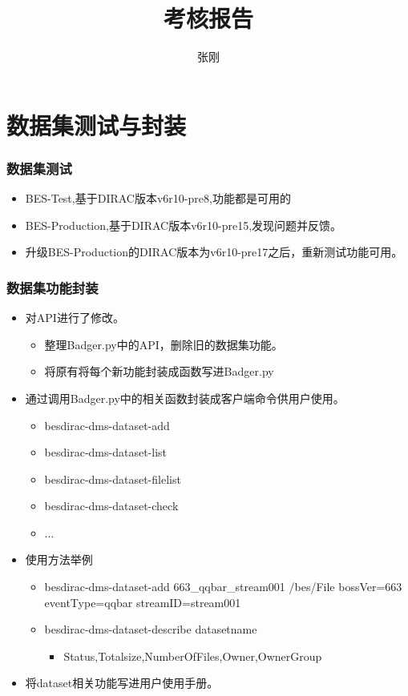 \documentclass{beamer}
\title{考核报告}
\author{张刚}
\institute{}
\begin{document}
\maketitle


\section{数据集测试与封装}
\begin{frame}
  \frametitle{数据集测试}
  \begin{itemize}
    \item BES-Test,基于DIRAC版本v6r10-pre8,功能都是可用的 
    \item BES-Production,基于DIRAC版本v6r10-pre15,发现问题并反馈。
    \item 升级BES-Production的DIRAC版本为v6r10-pre17之后，重新测试功能可用。 
  \end{itemize}
\end{frame}
\begin{frame}
  \frametitle{数据集功能封装}
  \begin{itemize}
    \item 对API进行了修改。
    \begin{itemize}
      \item 整理Badger.py中的API，删除旧的数据集功能。
      \item 将原有将每个新功能封装成函数写进Badger.py
    \end{itemize}
    \item 通过调用Badger.py中的相关函数封装成客户端命令供用户使用。
      \begin{itemize}
        \item besdirac-dms-dataset-add
        \item besdirac-dms-dataset-list
        \item besdirac-dms-dataset-filelist
        \item besdirac-dms-dataset-check 
        \item ...
      \end{itemize}
    \item 使用方法举例
      \begin{itemize}
        \item besdirac-dms-dataset-add 663\_qqbar\_stream001 /bes/File bossVer=663 eventType=qqbar streamID=stream001
        \item besdirac-dms-dataset-describe datasetname
          \begin{itemize}
            \item Status,Totalsize,NumberOfFiles,Owner,OwnerGroup
          \end{itemize}
      \end{itemize}
    \item 将dataset相关功能写进用户使用手册。
  \end{itemize}
\end{frame}
\end{document}

